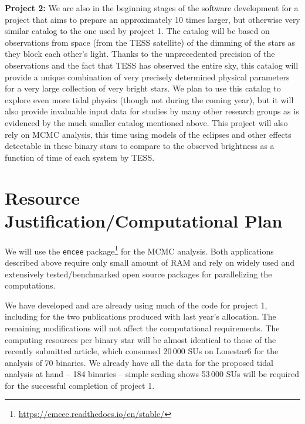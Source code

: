 \documentclass[12pt]{article}
\begin{document}
\textbf{Project 2:} We are also in the beginning stages of the software
development for a project that aims to prepare an approximately 10 times larger,
but otherwise very similar catalog to the one used by project 1. The catalog
will be based on observations from space (from the TESS satellite) of the
dimming of the stars as they block each other's light. Thanks to the
unprecedented precision of the observations and the fact that TESS has observed
the entire sky, this catalog will provide a unique combination of very precisely
determined physical parameters for a very large collection of very bright stars.
We plan to use this catalog to explore even more tidal physics (though not
during the coming year), but it will also provide invaluable input data for
studies by many other research groups as is evidenced by the much smaller
catalog mentioned above.  This project will also rely on MCMC analysis, this
time using models of the eclipses and other effects detectable in these binary
stars to compare to the observed brightness as a function of time of each system
by TESS.

\section{Resource Justification/Computational Plan}

We will use the \texttt{emcee}
package\footnote{\url{https://emcee.readthedocs.io/en/stable/}} for the MCMC
analysis. Both applications described above require only small amount of RAM and
rely on widely used and extensively tested/benchmarked open source packages
for parallelizing the computations.

We have developed and are already using much of the code for project 1,
including for the two publications produced with last year's allocation.  The
remaining modifications will not affect the computational requirements. The
computing resources per binary star will be almost identical to those of the
recently submitted article, which consumed 20\,000 SUs on Lonestar6 for the
analysis of 70 binaries. We already have all the data for the proposed tidal
analysis at hand -- 184 binaries -- simple scaling shows 53\,000 SUs will be
required for the successful completion of project 1.
\end{document}
